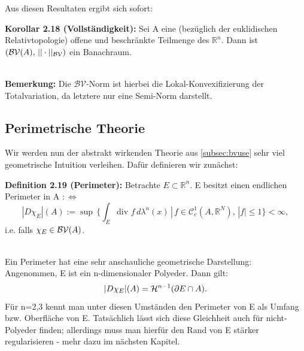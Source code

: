 Aus diesen Resultaten ergibt sich sofort:\\[0.5cm]
\colorbox{generalYellow}{\begin{minipage}{16cm}{\textcolor{black}{}{\label{kor2.18}}}
\textbf{Korollar 2.18 (Vollständigkeit):} Sei A eine (bezüglich der euklidischen Relativtopologie) offene und beschränkte Teilmenge des \(\mathbb{R}^n\). Dann ist \((\mathcal{BV}(A), \, ||\cdot||_{\mathcal{BV}})\) ein Banachraum.
\end{minipage}}\\

\textbf{Bemerkung:} Die \(\mathcal{BV}\)-Norm ist hierbei die Lokal-Konvexifizierung der Totalvariation, da letztere nur eine Semi-Norm darstellt.
\subsection{Perimetrische Theorie}{\label{subsec:perim}}
Wir werden nun der abstrakt wirkenden Theorie aus \ref{subsec:bvuse} sehr viel geometrische Intuition verleihen. Dafür definieren wir zunächst:\\[0.5cm]
\colorbox{generalYellow}{\begin{minipage}{16cm}{\textcolor{black}{}{\label{def2.19}}}
\textbf{Definition 2.19 (Perimeter):} Betrachte \(E \subset \mathbb{R}^n\). E besitzt einen endlichen Perimeter in A \(: \Leftrightarrow\)
\begin{equation}
    |D \chi_E|(A) := \sup \, \{\int_E \text{div }f\, d\lambda^n(x) \, | \, f \in \mathcal{C}^1_c(A,\mathbb{R}^N), \, |f| \leq 1\} < \infty,
\end{equation}
i.e. falls \(\chi_E \in \mathcal{BV}(A)\).
\end{minipage}}\\

Ein Perimeter hat eine sehr anschauliche geometrische Darstellung: Angenommen, E ist ein n-dimensionaler Polyeder. Dann gilt:
\begin{equation}{\label{eq2.23}}
    |D \chi_E|(A) = \mathcal{H}^{n-1} (\partial E \cap A).
\end{equation}
Für n=2,3 kennt man unter diesen Umständen den Perimeter von E als Umfang bzw. Oberfläche von E. Tatsächlich lässt sich diese Gleichheit auch für nicht-Polyeder finden; allerdings muss man hierfür den Rand von E stärker regularisieren - mehr dazu im nächsten Kapitel.\\

